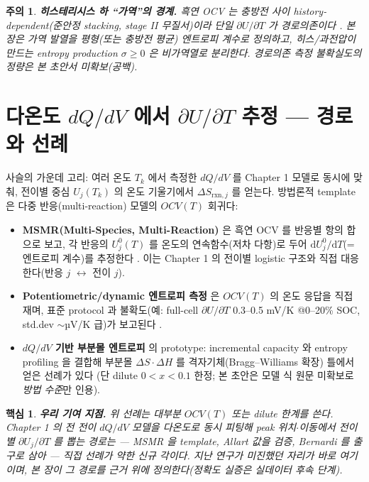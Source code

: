 \documentclass[11pt,a4paper]{article}
\newtheorem*{keybox}{핵심}
\newtheorem*{warnbox}{주의}
\newcommand{\dd}{\mathrm{d}}
\newcommand{\rxn}{\mathrm{rxn}}
\begin{document}
\begin{warnbox}
\textbf{히스테리시스 하 ``가역''의 경계.} 흑연 OCV 는 충방전 사이 history-dependent(준안정 stacking,
stage II 무질서)이라 단일 $\partial U/\partial T$ 가 경로의존이다 \cite{hysteresis2018}. 본 장은 가역 발열을
\emph{평형(또는 충방전 평균) 엔트로피 계수}로 정의하고, 히스/과전압이 만드는 entropy production
$\sigma\ge0$ 은 비가역열로 분리한다. 경로의존 측정 불확실도의 정량은 본 초안서 미확보(공백).
\end{warnbox}

\section{다온도 $dQ/dV$ 에서 $\partial U/\partial T$ 추정 — 경로와 선례}\label{sec:estimate}
사슬의 가운데 고리: 여러 온도 $T_k$ 에서 측정한 $dQ/dV$ 를 Chapter 1 모델로 동시에 맞춰, 전이별 중심
$U_j(T_k)$ 의 온도 기울기에서 $\Delta S_{\rxn,j}$ 를 얻는다. 방법론적 template 은 다중 반응(multi-reaction)
모델의 $OCV(T)$ 회귀다:
\begin{itemize}[leftmargin=1.4em,itemsep=2pt]
\item \textbf{MSMR(Multi-Species, Multi-Reaction)} 은 흑연 OCV 를 반응별 항의 합으로 보고, 각 반응의
$U_j^0(T)$ 를 온도의 연속함수(저차 다항)로 두어 $\dd U_j^0/\dd T$(=엔트로피 계수)를 추정한다
\cite{msmr_partI,msmr_partII}. 이는 Chapter 1 의 전이별 logistic 구조와 직접 대응한다(반응 $j$ $\leftrightarrow$
전이 $j$).
\item \textbf{Potentiometric/dynamic 엔트로피 측정} 은 $OCV(T)$ 의 온도 응답을 직접 재며, 표준 protocol 과
불확도(예: full-cell $\partial U/\partial T$ 0.3–0.5 mV/K @0–20\% SOC, std.dev $\sim$µV/K 급)가 보고된다
\cite{standardised2024}.
\item \textbf{$dQ/dV$ 기반 부분몰 엔트로피} 의 prototype: incremental capacity 와 entropy profiling 을 결합해
부분몰 $\Delta S\cdot\Delta H$ 를 격자기체(Bragg–Williams 확장) 틀에서 얻은 선례가 있다
\cite{occupation2019}(단 dilute $0<x<0.1$ 한정; 본 초안은 모델 식 원문 미확보로 \emph{방법 수준}만 인용).
\end{itemize}

\begin{keybox}
\textbf{우리 기여 지점.} 위 선례는 대부분 \emph{$OCV(T)$} 또는 dilute 한계를 쓴다. Chapter 1 의 \emph{전} 전이
$dQ/dV$ 모델을 다온도로 동시 피팅해 \emph{peak 위치$\cdot$이동}에서 전이별 $\partial U_j/\partial T$ 를 뽑는
경로는 — MSMR 을 template, Allart 값을 검증, Bernardi 를 출구로 삼아 — 직접 선례가 약한 \emph{신규 각}이다.
지난 연구가 미진했던 자리가 바로 여기이며, 본 장이 그 경로를 근거 위에 정의한다(정확도 실증은 실데이터
후속 단계).
\end{keybox}
\end{document}
